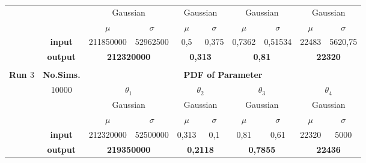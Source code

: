 \begin{table}[htbp]
{\begin{tabular}{|r|c|cc|cc|cc|cc|}
\cmidrule{3-10}      &       & \multicolumn{2}{c|}{Gaussian} & \multicolumn{2}{c|}{Gaussian} & \multicolumn{2}{c|}{Gaussian} & \multicolumn{2}{c|}{Gaussian} \\
\cmidrule{2-10}      &       & \multicolumn{1}{c|}{\boldmath{}\textbf{$\mu$}\unboldmath{}} & \boldmath{}\textbf{$\sigma$}\unboldmath{} & \multicolumn{1}{c|}{\boldmath{}\textbf{$\mu$}\unboldmath{}} & \boldmath{}\textbf{$\sigma$}\unboldmath{} & \multicolumn{1}{c|}{\boldmath{}\textbf{$\mu$}\unboldmath{}} & \boldmath{}\textbf{$\sigma$}\unboldmath{} & \multicolumn{1}{c|}{\boldmath{}\textbf{$\mu$}\unboldmath{}} & \boldmath{}\textbf{$\sigma$}\unboldmath{} \\
\cmidrule{2-10}      & \textbf{input} & 211850000 & 52962500 & 0,5   & 0,375 & 0,7362 & 0,51534 & 22483 & 5620,75 \\
\cmidrule{2-10}      & \textbf{output} & \multicolumn{2}{c|}{\textbf{212320000}} & \multicolumn{2}{c|}{\textbf{0,313}} & \multicolumn{2}{c|}{\textbf{0,81}} & \multicolumn{2}{c|}{\textbf{22320}} \\
\hline
\multicolumn{1}{|r}{} & \multicolumn{1}{r}{} &       & \multicolumn{1}{r}{} &       & \multicolumn{1}{r}{} &       & \multicolumn{1}{r}{} &       &  \\
\hline
\multicolumn{1}{|l|}{\boldmath{}\textbf{Run $3$}\unboldmath{}} & \textbf{No.Sims.} & \multicolumn{8}{c|}{\textbf{PDF of Parameter}} \\
\hline
      & 10000 & \multicolumn{2}{c|}{\boldmath{}\textbf{$\theta_1$}\unboldmath{}} & \multicolumn{2}{c|}{\boldmath{}\textbf{$\theta_2$}\unboldmath{}} & \multicolumn{2}{c|}{\boldmath{}\textbf{$\theta_3$}\unboldmath{}} & \multicolumn{2}{c|}{\boldmath{}\textbf{$\theta_4$}\unboldmath{}} \\
\cmidrule{3-10}      &       & \multicolumn{2}{c|}{Gaussian} & \multicolumn{2}{c|}{Gaussian} & \multicolumn{2}{c|}{Gaussian} & \multicolumn{2}{c|}{Gaussian} \\
\cmidrule{2-10}      &       & \multicolumn{1}{c|}{\boldmath{}\textbf{$\mu$}\unboldmath{}} & \boldmath{}\textbf{$\sigma$}\unboldmath{} & \multicolumn{1}{c|}{\boldmath{}\textbf{$\mu$}\unboldmath{}} & \boldmath{}\textbf{$\sigma$}\unboldmath{} & \multicolumn{1}{c|}{\boldmath{}\textbf{$\mu$}\unboldmath{}} & \boldmath{}\textbf{$\sigma$}\unboldmath{} & \multicolumn{1}{c|}{\boldmath{}\textbf{$\mu$}\unboldmath{}} & \boldmath{}\textbf{$\sigma$}\unboldmath{} \\
\cmidrule{2-10}      & \textbf{input} & 212320000 & 52500000 & 0,313 & 0,1   & 0,81  & 0,61  & 22320 & 5000 \\
\cmidrule{2-10}      & \textbf{output} & \multicolumn{2}{c|}{\textbf{219350000}} & \multicolumn{2}{c|}{\textbf{0,2118}} & \multicolumn{2}{c|}{\textbf{0,7855}} & \multicolumn{2}{c|}{\textbf{22436}} \\
\bottomrule[0.04cm]
\end{tabular}%
    }
\end{table}%
